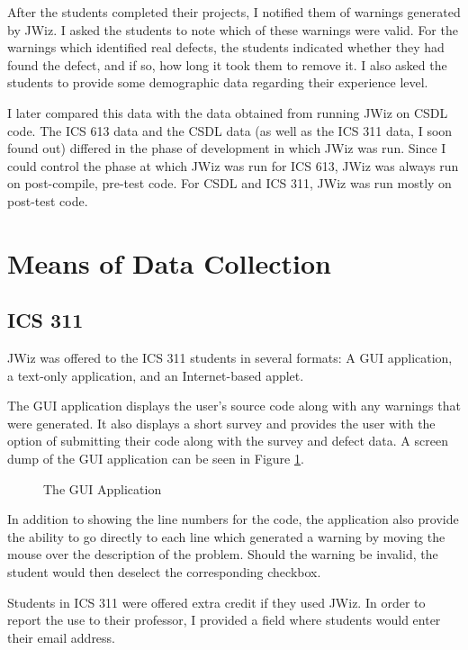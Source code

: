 After the students completed their projects, I notified them of warnings
generated by JWiz. I asked the students to note which of these warnings
were valid.  For the warnings which identified real defects, the students
indicated whether they had found the defect, and if so, how long it took
them to remove it.  I also asked the students to provide some demographic
data regarding their experience level.

I later compared this data with the data obtained from running JWiz on CSDL
code.  The ICS 613 data and the CSDL data (as well as the ICS 311 data, I
soon found out) differed in the phase of development in which JWiz was run.
Since I could control the phase at which JWiz was run for ICS 613, JWiz was
always run on post-compile, pre-test code.  For CSDL and ICS 311, JWiz was
run mostly on post-test code.

\section{Means of Data Collection}

\subsection{ICS 311}
JWiz was offered to the ICS 311 students in several formats: A GUI
application, a text-only application, and an Internet-based applet.

The GUI application displays the user's source code along with any warnings
that were generated.  It also displays a short survey and provides the user
with the option of submitting their code along with the survey and defect
data. A screen dump of the GUI application can be seen in Figure
\ref{GUIApplication}. %

\begin{figure}[tbp]
  {\centerline{}}
  \caption{The GUI Application}
  \label{GUIApplication}
\end{figure}
\newpage
In addition to showing the line numbers for the code, the application also
provide the ability to go directly to each line which generated a warning
by moving the mouse over the description of the problem.  Should the
warning be invalid, the student would then deselect the corresponding
checkbox.

Students in ICS 311 were offered extra credit if they used JWiz.  In order
to report the use to their professor, I provided a field where students
would enter their email address.

